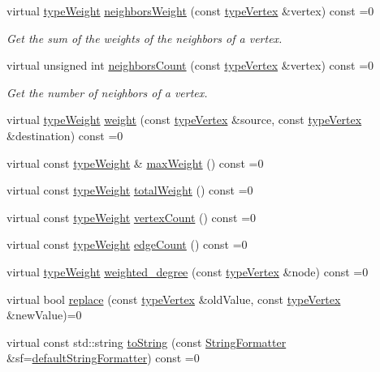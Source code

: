 \begin{DoxyCompactItemize}
virtual \hyperlink{edge_8h_a2e7ea3be891ac8b52f749ec73fee6dd2}{type\+Weight} \hyperlink{classGraphInterface_a77b93eb2da955cb41b389df023676c1b}{neighbors\+Weight} (const \hyperlink{edge_8h_a5fbd20c46956d479cb10afc9855223f6}{type\+Vertex} \&vertex) const =0
\begin{DoxyCompactList}\small\item\em Get the sum of the weights of the neighbors of a vertex. \end{DoxyCompactList}\item 
virtual unsigned int \hyperlink{classGraphInterface_a07f96d04c5481c6f573f478add5f7162}{neighbors\+Count} (const \hyperlink{edge_8h_a5fbd20c46956d479cb10afc9855223f6}{type\+Vertex} \&vertex) const =0
\begin{DoxyCompactList}\small\item\em Get the number of neighbors of a vertex. \end{DoxyCompactList}\item 
virtual \hyperlink{edge_8h_a2e7ea3be891ac8b52f749ec73fee6dd2}{type\+Weight} \hyperlink{classGraphInterface_a27f350094f566bb4840f22c5bc0695c4}{weight} (const \hyperlink{edge_8h_a5fbd20c46956d479cb10afc9855223f6}{type\+Vertex} \&source, const \hyperlink{edge_8h_a5fbd20c46956d479cb10afc9855223f6}{type\+Vertex} \&destination) const =0
\item 
virtual const \hyperlink{edge_8h_a2e7ea3be891ac8b52f749ec73fee6dd2}{type\+Weight} \& \hyperlink{classGraphInterface_a2fb0681f6cda5f8318adf7ee95df3685}{max\+Weight} () const =0
\item 
virtual const \hyperlink{edge_8h_a2e7ea3be891ac8b52f749ec73fee6dd2}{type\+Weight} \hyperlink{classGraphInterface_a3bf10ae8e4fc3b049b5e7ac23798b89f}{total\+Weight} () const =0
\item 
virtual const \hyperlink{edge_8h_a2e7ea3be891ac8b52f749ec73fee6dd2}{type\+Weight} \hyperlink{classGraphInterface_a483f64f8d37af2b363f2f4eb37943dfd}{vertex\+Count} () const =0
\item 
virtual const \hyperlink{edge_8h_a2e7ea3be891ac8b52f749ec73fee6dd2}{type\+Weight} \hyperlink{classGraphInterface_a057eb801c6d7f594cdedc205a0d081a9}{edge\+Count} () const =0
\item 
virtual \hyperlink{edge_8h_a2e7ea3be891ac8b52f749ec73fee6dd2}{type\+Weight} \hyperlink{classGraphInterface_a3a4bd9e37e69a4488a48f781e36ea686}{weighted\+\_\+degree} (const \hyperlink{edge_8h_a5fbd20c46956d479cb10afc9855223f6}{type\+Vertex} \&node) const =0
\item 
virtual bool \hyperlink{classGraphInterface_a448a3c66fb5650339f84366257d322ee}{replace} (const \hyperlink{edge_8h_a5fbd20c46956d479cb10afc9855223f6}{type\+Vertex} \&old\+Value, const \hyperlink{edge_8h_a5fbd20c46956d479cb10afc9855223f6}{type\+Vertex} \&new\+Value)=0
\item 
virtual const std\+::string \hyperlink{classGraphInterface_ac6d3da524ca5c95c3ebd80d2b0d5d762}{to\+String} (const \hyperlink{classStringFormatter}{String\+Formatter} \&sf=\hyperlink{stringFormatter_8h_abf1349c8e24162d0134072aff288f2a2}{default\+String\+Formatter}) const =0
\end{DoxyCompactItemize}


